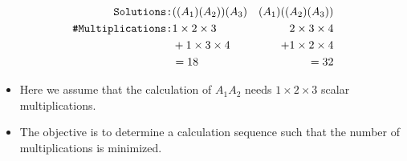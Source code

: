 \documentclass[mathserif]{beamer}
\begin{document}
{\begin{eqnarray}
\text{\tt Solutions:} &     ( (A_1) (A_2) )  (A_3 )    &   ( A_1 )  ( (A_2) (A_3) ) \nonumber \\ 
\text{\tt \#Multiplications:} &  1\times 2 \times 3  &  2  \times 3  \times 4   \nonumber \\
& +  1 \times 3 \times 4  & + 1 \times 2 \times 4 \nonumber  \\
& = 18 & = 32 \nonumber
\end{eqnarray}
\begin{itemize}
\item 
Here we assume that the calculation of $A_1 A_2$ needs $1 \times 2 \times 3$ scalar multiplications. 
\item 
The objective is to determine a calculation sequence  such that the number of multiplications is minimized. 
\end{itemize}

}
\end{document}
